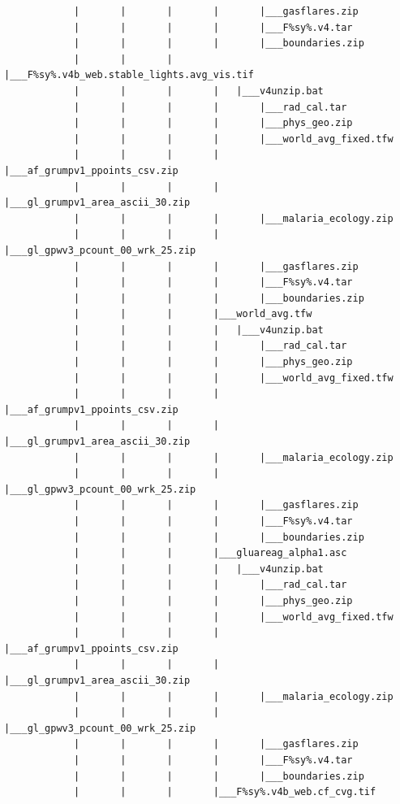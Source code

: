 \documentclass[]{book}
\begin{document}
\begin{verbatim}
            |       |       |       |       |___gasflares.zip
            |       |       |       |       |___F%sy%.v4.tar
            |       |       |       |       |___boundaries.zip
            |       |       |       |___F%sy%.v4b_web.stable_lights.avg_vis.tif
            |       |       |       |   |___v4unzip.bat
            |       |       |       |       |___rad_cal.tar
            |       |       |       |       |___phys_geo.zip
            |       |       |       |       |___world_avg_fixed.tfw
            |       |       |       |       |___af_grumpv1_ppoints_csv.zip
            |       |       |       |       |___gl_grumpv1_area_ascii_30.zip
            |       |       |       |       |___malaria_ecology.zip
            |       |       |       |       |___gl_gpwv3_pcount_00_wrk_25.zip
            |       |       |       |       |___gasflares.zip
            |       |       |       |       |___F%sy%.v4.tar
            |       |       |       |       |___boundaries.zip
            |       |       |       |___world_avg.tfw
            |       |       |       |   |___v4unzip.bat
            |       |       |       |       |___rad_cal.tar
            |       |       |       |       |___phys_geo.zip
            |       |       |       |       |___world_avg_fixed.tfw
            |       |       |       |       |___af_grumpv1_ppoints_csv.zip
            |       |       |       |       |___gl_grumpv1_area_ascii_30.zip
            |       |       |       |       |___malaria_ecology.zip
            |       |       |       |       |___gl_gpwv3_pcount_00_wrk_25.zip
            |       |       |       |       |___gasflares.zip
            |       |       |       |       |___F%sy%.v4.tar
            |       |       |       |       |___boundaries.zip
            |       |       |       |___gluareag_alpha1.asc
            |       |       |       |   |___v4unzip.bat
            |       |       |       |       |___rad_cal.tar
            |       |       |       |       |___phys_geo.zip
            |       |       |       |       |___world_avg_fixed.tfw
            |       |       |       |       |___af_grumpv1_ppoints_csv.zip
            |       |       |       |       |___gl_grumpv1_area_ascii_30.zip
            |       |       |       |       |___malaria_ecology.zip
            |       |       |       |       |___gl_gpwv3_pcount_00_wrk_25.zip
            |       |       |       |       |___gasflares.zip
            |       |       |       |       |___F%sy%.v4.tar
            |       |       |       |       |___boundaries.zip
            |       |       |       |___F%sy%.v4b_web.cf_cvg.tif

\end{verbatim}
\end{document}
